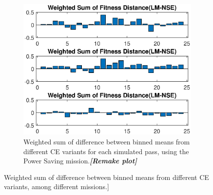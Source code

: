 \begin{figure}[ht!]
\begin{subfigure}{0.55\linewidth}
	\label{fig:cSimWeightCoop}
\end{subfigure}\\
\begin{center}
\begin{subfigure}{0.55\linewidth}
	\centering
	\includegraphics[scale=0.6]{figures/c_sim_results/power_weighted_sumFitness.eps}
	\caption{Weighted sum of difference between binned means from different CE variants for each simulated pass, using the Power Saving mission.\textbf{\textit{[Remake plot]}}}
	\label{fig:cSimWeightPower}
\end{subfigure}
\end{center}
\caption{Weighted sum of difference between binned means from different CE variants, among different missions.]}
\label{fig:weight_sumFit}
\end{figure}
\clearpage
